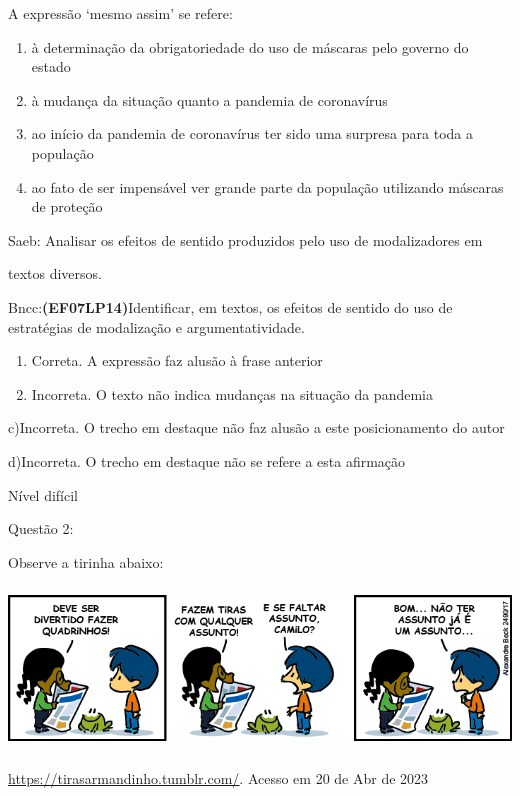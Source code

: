 A expressão `mesmo assim' se refere:

\begin{enumerate}
\def\labelenumi{\alph{enumi})}
\item
  à determinação da obrigatoriedade do uso de máscaras pelo governo do
  estado
\item
  à mudança da situação quanto a pandemia de coronavírus
\item
  ao início da pandemia de coronavírus ter sido uma surpresa para toda a
  população
\item
  ao fato de ser impensável ver grande parte da população utilizando
  máscaras de proteção
\end{enumerate}

Saeb: Analisar os efeitos de sentido produzidos pelo uso de
modalizadores em

textos diversos.

Bncc:\textbf{(EF07LP14)}Identificar, em textos, os efeitos de sentido do
uso de estratégias de modalização e argumentatividade.

\begin{enumerate}
\def\labelenumi{\arabic{enumi}.}
\item
  Correta. A expressão faz alusão à frase anterior
\item
  Incorreta. O texto não indica mudanças na situação da pandemia
\end{enumerate}

c)Incorreta. O trecho em destaque não faz alusão a este posicionamento
do autor

d)Incorreta. O trecho em destaque não se refere a esta afirmação

Nível difícil

Questão 2:

Observe a tirinha abaixo:

\includegraphics[width=5.90551in,height=1.70833in]{./imgSAEB_7_POR/media/image12.png}

\href{https://tirasarmandinho.tumblr.com/}{\uline{https://tirasarmandinho.tumblr.com/}}.
Acesso em 20 de Abr de 2023

